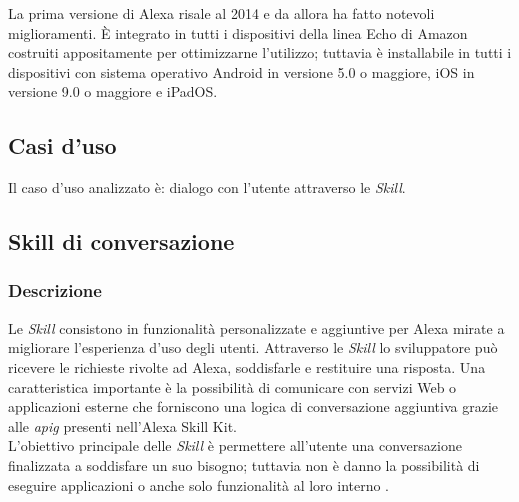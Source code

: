 	La prima versione di Alexa risale al 2014 e da allora ha fatto notevoli miglioramenti. È integrato in tutti i dispositivi della linea Echo di Amazon costruiti appositamente per ottimizzarne l'utilizzo; tuttavia è installabile in tutti i dispositivi con sistema operativo Android in versione 5.0 o maggiore, iOS in versione 9.0 o maggiore e iPadOS.
	\subsection{Casi d'uso}
	Il caso d'uso analizzato è: dialogo con l'utente attraverso le \emph{Skill}.
	\subsection{Skill di conversazione}
		\subsubsection{Descrizione}
		Le \emph{Skill} consistono in funzionalità personalizzate e aggiuntive per Alexa mirate a migliorare l'esperienza d'uso degli utenti. Attraverso le \emph{Skill} lo sviluppatore può ricevere le richieste rivolte ad Alexa, soddisfarle e restituire una risposta. Una caratteristica importante è la possibilità di comunicare con servizi Web o applicazioni esterne che forniscono una logica di conversazione aggiuntiva grazie alle \emph{\gls{apig}} presenti nell'Alexa Skill Kit. \\
		L'obiettivo principale delle \emph{Skill} è permettere all'utente una conversazione finalizzata a soddisfare un suo bisogno; tuttavia non è danno la possibilità di eseguire applicazioni o anche solo funzionalità al loro interno .
